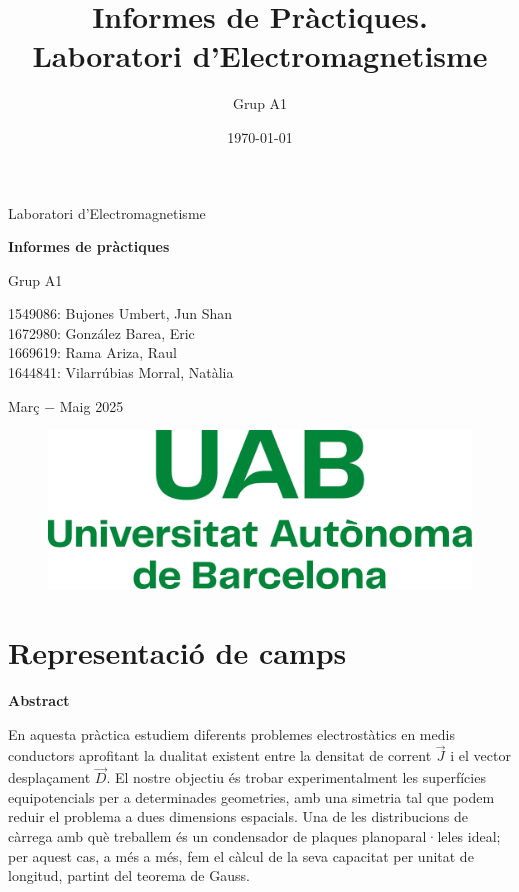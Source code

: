 \documentclass[a4paper,10.5pt]{report}
\title{\textbf{\huge{Informes de Pràctiques. \\ \vspace{0.2cm} Laboratori d'Electromagnetisme}}}
\author{Grup A1}
\date{\today}
\newenvironment{chapterabstract}{
	\begin{center}
		\bfseries Abstract
	\end{center}
	\quotation
}{\endquotation}
\begin{document}
	
\begin{titlepage}
	\centering
	{\LARGE Laboratori d'Electromagnetisme \par}
	\vspace{2cm}
	{\Huge \textbf{Informes de pràctiques} \par}
	\vspace{3cm}
	{\Large Grup A1 \par}
	\vspace{0.5cm}
	{\Large 1549086: Bujones Umbert, Jun Shan\\ 1672980: González Barea, Eric\\1669619: Rama Ariza, Raul\\1644841: Vilarrúbias Morral, Natàlia \par}
	\vspace{2cm}
	{\Large Març $-$ Maig 2025 \par}
	\vspace{2cm}
	
	\begin{figure}[h]
		\centering
		\includegraphics[width=0.3\linewidth]{screenshot001}
		\label{fig:screenshot001}
	\end{figure}
\end{titlepage}

\tableofcontents
\newpage

\chapter{Representació de camps} 

\begin{chapterabstract}
	En aquesta pràctica estudiem diferents problemes electrostàtics en medis conductors aprofitant la dualitat existent entre la densitat de corrent $\vec{J}$ i el vector desplaçament $\vec{D}$. El nostre objectiu és trobar experimentalment les superfícies equipotencials per a determinades geometries, amb una simetria tal que podem reduir el problema a dues dimensions espacials. Una de les distribucions de càrrega amb què treballem és un condensador de plaques planoparal·leles ideal; per aquest cas, a més a més, fem el càlcul de la seva capacitat per unitat de longitud, partint del teorema de Gauss.
\end{chapterabstract}
\end{document}
